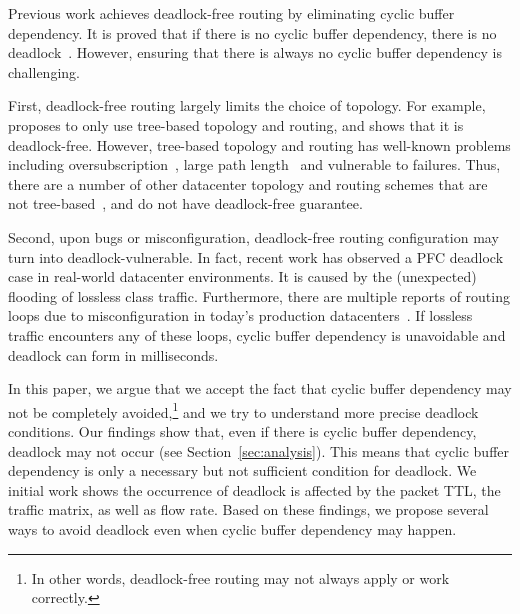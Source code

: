 Previous work achieves deadlock-free routing by eliminating cyclic buffer dependency.
It is proved that if there is no cyclic buffer dependency, there is no deadlock~\cite{deadlockfree}.
However, ensuring that there is always no cyclic buffer dependency is challenging.

First, deadlock-free routing largely limits the choice of topology. For example, \cite{tcpbolt}
proposes to only use tree-based topology and routing, and shows that it is deadlock-free.
However, tree-based topology and routing has well-known problems including oversubscription~\cite{fattree},
large path length~\cite{jellyfish} and vulnerable to failures.
Thus, there are a number of other datacenter topology and routing schemes that are not
tree-based~\cite{bcube, camcube, jellyfish}, and do not have deadlock-free guarantee.

Second, upon bugs or misconfiguration, deadlock-free routing configuration may turn into
deadlock-vulnerable. In fact, recent work has observed a PFC deadlock case in real-world
datacenter environments\cite{rdmascale}. It is caused by the (unexpected) flooding of
lossless class traffic. Furthermore, there are multiple reports of routing loops due to misconfiguration
in today's production datacenters~\cite{everflow, libra}. If lossless traffic encounters
any of these loops, cyclic buffer dependency is unavoidable and deadlock can form in milliseconds.

In this paper, we argue that we accept the fact that cyclic buffer dependency may not be completely
avoided,\footnote{In other words, deadlock-free routing may not always apply or work correctly.}
and we try to understand more precise deadlock conditions. Our findings show that,
even if there is cyclic buffer dependency, deadlock may not occur (see Section~\ref{sec:analysis}).
This means that cyclic buffer dependency is only a necessary but not sufficient condition for deadlock.
We initial work shows the occurrence of deadlock is affected by the packet TTL, the traffic matrix, as well as flow rate. Based on these findings, we propose several ways to avoid deadlock even when cyclic buffer dependency may happen. 


